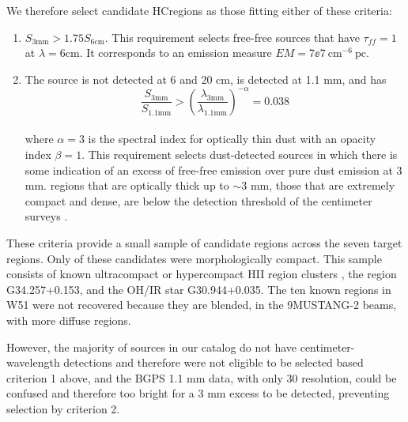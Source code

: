 \documentclass[twocolumn]{aastex62}
\newcommand{\MUSTANG}{MUSTANG-2\xspace}
\begin{document}
We therefore select candidate HC\hii regions
as those fitting either of these criteria:
\begin{enumerate}
    \item $S_{3 \mathrm{mm}} > 1.75 S_{6 \mathrm{cm}}$.  %
        This requirement selects free-free sources that have $\tau_{ff}=1$
        at $\lambda = {6 \mathrm{cm}}$.  It corresponds to an emission
        measure ${EM=7\ee{7}~\mathrm{cm}^{-6}~\mathrm{pc}}$.
    \item
        The source is not detected at 6 and 20 cm, is detected at 1.1 mm, and has
        \begin{equation}
            \frac{S_{3 \mathrm{mm}}}{S_{1.1 \mathrm{mm}}} > \left(\frac{\lambda_{3 \mathrm{mm}}}
            {\lambda_{1.1 \mathrm{mm}}}\right)^{-\alpha} = 0.038
        \end{equation}\\
        where $\alpha=3$ is the spectral
        index for optically thin dust with an opacity index $\beta=1$.  This
        requirement selects dust-detected sources in which there is some
        indication of an excess of free-free emission over pure dust emission
        at 3 mm.
        \hchii regions that are optically
        thick up to $\sim3$ mm, those that are extremely compact and dense,
        are below the detection threshold of the centimeter surveys
        \citep[$\approx2.5$ mJy at 6 cm;][]{Giveon2005a,Hoare2012a}.
\end{enumerate}

These criteria provide a small sample of \nhiicand candidate \hchii regions
across the seven target regions.  Only \ncompacthiicand of these candidates
were morphologically compact. This sample consists of known
ultracompact or hypercompact HII region clusters \citep[three are parts of W49A, which contains
12 sources that can be classified as \hchii regions][]{De-Pree1997a},
the \hchii region G34.257+0.153, and the OH/IR star G30.944+0.035.
The ten known \hchii regions in W51 \citep{Ginsburg2016b} were not recovered because
they are blended, in the 9\arcsec \MUSTANG beams, with more diffuse \hii regions.

However, the majority of sources in our catalog do not have
centimeter-wavelength detections and therefore were not
eligible to be selected based criterion 1 above, and the BGPS 1.1 mm data,
with only 30 \arcsec resolution, could be confused and therefore too bright for
a 3 mm excess to be detected, preventing selection by criterion 2. 
\end{document}
